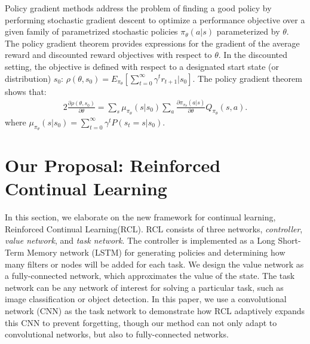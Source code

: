 \documentclass{article}
\begin{document}
Policy gradient methods address the problem of finding a good policy by performing stochastic gradient descent to optimize a performance objective over a given family of parametrized stochastic policies $\pi_\theta (a|s)$ parameterized by $\theta$. The policy
gradient theorem \cite{sutton2} provides expressions for the gradient of the average reward and discounted reward objectives with respect to $\theta$. In the discounted setting, the objective is defined with respect to a designated start state (or distribution) $s_0$: $\rho(\theta,s_0) = E_{\pi_\theta}[\sum_{t=0}^\infty\gamma^{t}r_{t+1}|s_0 ]$. The policy gradient theorem shows
that: 
\begin{alignat}{2}  %
\label{eq01}
\frac{\partial \rho(\theta,s_0)}{\partial \theta} = \sum_s \mu_{\pi_\theta}(s|s_0)\sum_a\frac{\partial \pi_{\pi_\theta}(a|s)}{\partial \theta}Q_{\pi_\theta}(s,a).
\end{alignat}
where $\mu_{\pi_\theta}(s|s_0)= \sum_{t=0}^\infty\gamma^tP(s_t = s|s_0) $.



\section{Our Proposal: Reinforced Continual Learning}
\label{sec:rcl}
In this section, we elaborate on the new framework for continual learning, Reinforced Continual Learning(RCL). RCL consists of three networks,  \emph{controller},  \emph{value network}, and  \emph{ task network}.  The controller is implemented as a Long Short-Term Memory network (LSTM) for generating policies and determining how many filters or nodes will be added for each task. We design the value network as a fully-connected network, which approximates the value of the state. The task network can be any network of interest for solving a particular task, such as image classification or object detection.  In this paper, we  use a convolutional network (CNN) as the task network to demonstrate how RCL adaptively expands this CNN to prevent forgetting, though our method can not only adapt to convolutional networks, but also to fully-connected networks.
\end{document}
